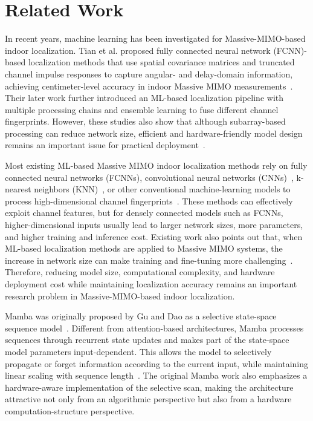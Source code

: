 \documentclass[11pt,twoside]{eitExjobb}
\begin{document}
\section{Related Work}
In recent years, machine learning has been investigated for Massive-MIMO-based indoor
localization. Tian et al. proposed fully connected neural network (FCNN)-based localization methods that use spatial
covariance matrices and truncated channel impulse responses to capture angular- and
delay-domain information, achieving centimeter-level accuracy in indoor Massive MIMO
measurements~\cite{cite:TianICC2023}. Their later work further introduced an ML-based
localization pipeline with multiple processing chains and ensemble learning to fuse
different channel fingerprints. However, these studies also show
that although subarray-based processing can reduce network size, efficient and
hardware-friendly model design remains an important issue for practical
deployment~\cite{cite:Tian2024}.

Most existing ML-based Massive MIMO indoor localization methods rely on fully
connected neural networks (FCNNs), convolutional neural networks
(CNNs)~\cite{cite:Colpaert2023}, k-nearest neighbors
(KNN)~\cite{cite:Cunningham2022KNN}, or other conventional machine-learning models to process high-dimensional
channel fingerprints~\cite{cite:Tian2024}. These methods can effectively exploit
channel features, but for densely connected models such as FCNNs, higher-dimensional
inputs usually lead to larger network sizes, more parameters, and higher training and
inference cost. Existing work also points out that, when ML-based localization methods
are applied to Massive MIMO systems, the increase in network size can make training and
fine-tuning more challenging~\cite{cite:Tian2024}. Therefore, reducing model size,
computational complexity, and hardware deployment cost while maintaining localization
accuracy remains an important research problem in Massive-MIMO-based indoor
localization.

Mamba was originally proposed by Gu and Dao as a selective state-space sequence
model~\cite{cite:Mamba2023}. Different from attention-based architectures,
Mamba processes sequences through recurrent state updates and makes part of the
state-space model parameters input-dependent. This allows the model to
selectively propagate or forget information according to the current input,
while maintaining linear scaling with sequence length~\cite{cite:Mamba2023}.
The original Mamba work also emphasizes a hardware-aware implementation of the
selective scan, making the architecture attractive not only from an algorithmic
perspective but also from a hardware computation-structure perspective.
\end{document}
